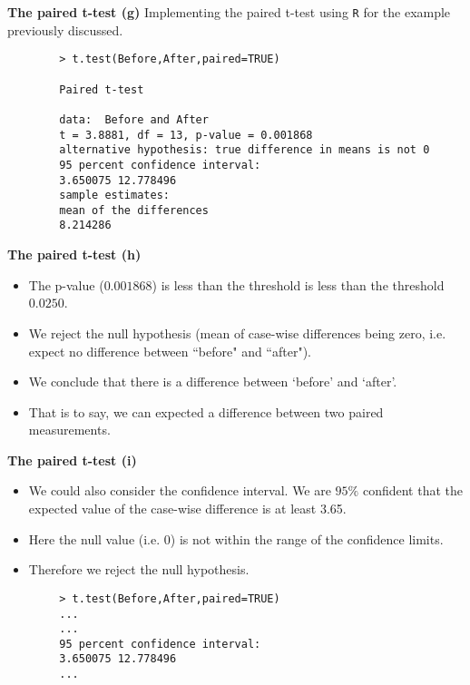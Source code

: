 \documentclass[]{report}
\begin{document}
		
		
		\textbf{The paired t-test (g)}
		Implementing the paired t-test using \texttt{R} for the example previously discussed.
		\begin{verbatim}
		> t.test(Before,After,paired=TRUE)
		
		Paired t-test
		
		data:  Before and After
		t = 3.8881, df = 13, p-value = 0.001868
		alternative hypothesis: true difference in means is not 0
		95 percent confidence interval:
		3.650075 12.778496
		sample estimates:
		mean of the differences
		8.214286
		\end{verbatim}
		
		
		
		\textbf{The paired t-test (h)}
		\begin{itemize}
			\item  The p-value ($0.001868$) is less than the threshold is less than the threshold $0.0250$.
			\item  We reject the null hypothesis (mean of case-wise differences being zero, i.e. expect no difference between ``before" and ``after").
			\item  We conclude that there is a difference between `before' and `after'.
			\item  That is to say, we can expected a difference between two paired measurements.
		\end{itemize}
		
		
		\textbf{The paired t-test (i)}
		\begin{itemize}
			\item  We could also consider the confidence interval. We are $95\%$ confident that the expected value of the case-wise difference is at least 3.65.
			\item  Here the null value (i.e. 0) is not within the range of the confidence limits.
			\item  Therefore we reject the null hypothesis.
		\end{itemize}
		\begin{verbatim}
		> t.test(Before,After,paired=TRUE)
		...
		...
		95 percent confidence interval:
		3.650075 12.778496
		...
		\end{verbatim}
		
		
		
		
		
\end{document}
